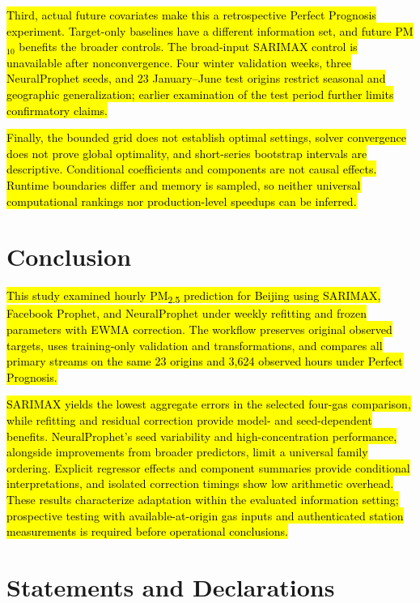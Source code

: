 \documentclass[pdflatex,sn-basic,Numbered]{sn-jnl}
\newcommand{\rev}[1]{\hl{#1}}
\begin{document}
\rev{Third, actual future covariates make this a retrospective Perfect Prognosis experiment. Target-only baselines have a different information set, and future PM$_{10}$ benefits the broader controls. The broad-input SARIMAX control is unavailable after nonconvergence. Four winter validation weeks, three NeuralProphet seeds, and 23 January--June test origins restrict seasonal and geographic generalization; earlier examination of the test period further limits confirmatory claims.}

\rev{Finally, the bounded grid does not establish optimal settings, solver convergence does not prove global optimality, and short-series bootstrap intervals are descriptive. Conditional coefficients and components are not causal effects. Runtime boundaries differ and memory is sampled, so neither universal computational rankings nor production-level speedups can be inferred.}

\section{Conclusion}

\rev{This study examined hourly PM\textsubscript{2.5} prediction for Beijing using SARIMAX, Facebook Prophet, and NeuralProphet under weekly refitting and frozen parameters with EWMA correction. The workflow preserves original observed targets, uses training-only validation and transformations, and compares all primary streams on the same 23 origins and 3,624 observed hours under Perfect Prognosis.}

\rev{SARIMAX yields the lowest aggregate errors in the selected four-gas comparison, while refitting and residual correction provide model- and seed-dependent benefits. NeuralProphet's seed variability and high-concentration performance, alongside improvements from broader predictors, limit a universal family ordering. Explicit regressor effects and component summaries provide conditional interpretations, and isolated correction timings show low arithmetic overhead. These results characterize adaptation within the evaluated information setting; prospective testing with available-at-origin gas inputs and authenticated station measurements is required before operational conclusions.}

\backmatter



\section*{Statements and Declarations}
\end{document}

